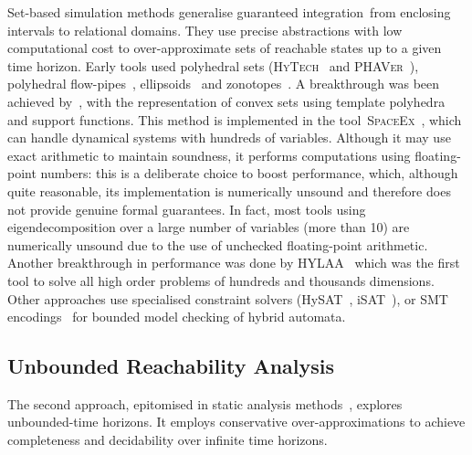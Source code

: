 \documentclass{IEEEtran}
\begin{document}
{{\begin{table}[b!]
{\begin{table*}[t]
Set-based simulation methods generalise guaranteed integration~\cite{Loe88,Bou08}from enclosing intervals to relational domains.  They use precise
abstractions with low computational cost to over-approximate sets
of reachable states up to a given time horizon.
Early tools used polyhedral sets (\textsc{HyTech}~\cite{HHW97} and
\textsc{PHAVer}~\cite{Fre05}), 
polyhedral flow-pipes~\cite{CK98}, 
ellipsoids~\cite{BT00} and zonotopes~\cite{Gir05}. 
A breakthrough was been achieved by~\cite{GLM06,LG09}, with the
representation of convex sets using template polyhedra and support
functions.  This method is implemented in the
tool~\textsc{SpaceEx}~\cite{FLD+11}, which can handle dynamical systems with
hundreds of variables. Although it may use exact arithmetic to maintain soundness,
it performs computations using floating-point numbers: this is a deliberate choice to
boost performance, which, although quite reasonable, its implementation is numerically
unsound and therefore does not provide genuine formal guarantees.
In fact, most tools using eigendecomposition over a large number of variables (more than 10)
are numerically unsound due to the use of unchecked floating-point arithmetic.
Another breakthrough in performance was done by HYLAA~\cite{DBLP:conf/hybrid/BakD17} which
was the first tool to solve all high order problems of hundreds and thousands dimensions.
Other approaches use specialised constraint solvers (HySAT~\cite{FH07},
iSAT~\cite{EFH08}), or SMT encodings~\cite{CMT12,GT08} for bounded model
checking of hybrid automata.

\subsection{Unbounded Reachability Analysis}\label{sec:unbounded_RW}


The second approach, epitomised in static analysis methods~\cite{HRP94},
explores unbounded-time horizons.  It employs conservative
over-approximations to achieve completeness and decidability over infinite
time horizons.


\end{table*}}
\end{table}}}
\end{document}
